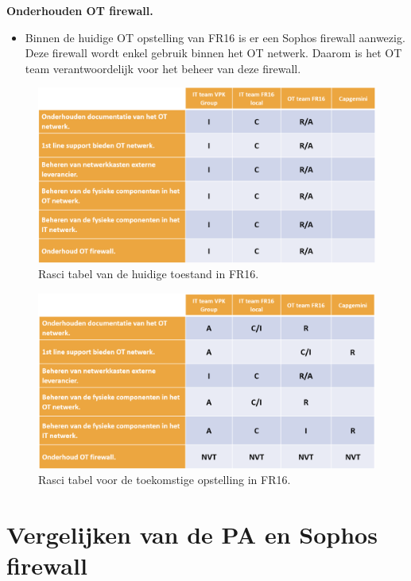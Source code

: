 \textbf{Onderhouden OT firewall.}
\begin{itemize}[label=\textbullet]
    \item Binnen de huidige OT opstelling van FR16 is er een Sophos firewall aanwezig. Deze firewall wordt enkel gebruik binnen het OT netwerk. Daarom is het OT team verantwoordelijk voor het beheer van deze firewall.
\end{itemize}



\begin{figure}[H]
    \centering
    \includegraphics[width=1\textwidth]{fotos/Rasci_AS-IS.png}
    \caption[Foto Rasci AS-IS]{\label{fig:grail}Rasci tabel van de huidige toestand in FR16.}
\end{figure} 

\begin{figure}[H]
    \centering
    \includegraphics[width=1\textwidth]{fotos/Rasci_TO-BE.png}
    \caption[Foto Rasci TO-BE]{\label{fig:grail}Rasci tabel voor de toekomstige opstelling in FR16.}
\end{figure} 


\chapter{Vergelijken van de PA en Sophos firewall}


